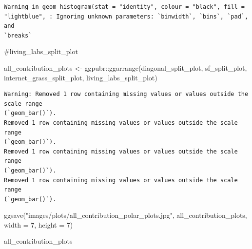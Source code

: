 \documentclass[
  letterpaper,
  DIV=11,
  numbers=noendperiod]{scrreprt}
\newenvironment{Shaded}{\begin{snugshade}}{\end{snugshade}}
\newcommand{\AttributeTok}[1]{\textcolor[rgb]{0.40,0.45,0.13}{#1}}
\newcommand{\CommentTok}[1]{\textcolor[rgb]{0.37,0.37,0.37}{#1}}
\newcommand{\DecValTok}[1]{\textcolor[rgb]{0.68,0.00,0.00}{#1}}
\newcommand{\FunctionTok}[1]{\textcolor[rgb]{0.28,0.35,0.67}{#1}}
\newcommand{\NormalTok}[1]{\textcolor[rgb]{0.00,0.23,0.31}{#1}}
\newcommand{\OtherTok}[1]{\textcolor[rgb]{0.00,0.23,0.31}{#1}}
\newcommand{\SpecialCharTok}[1]{\textcolor[rgb]{0.37,0.37,0.37}{#1}}
\newcommand{\StringTok}[1]{\textcolor[rgb]{0.13,0.47,0.30}{#1}}
\begin{document}
\begin{verbatim}
Warning in geom_histogram(stat = "identity", colour = "black", fill =
"lightblue", : Ignoring unknown parameters: `binwidth`, `bins`, `pad`, and
`breaks`
\end{verbatim}

\begin{Shaded}
\begin{Highlighting}[]
\CommentTok{\#living\_labs\_split\_plot}
\end{Highlighting}
\end{Shaded}

\begin{Shaded}
\begin{Highlighting}[]
\NormalTok{all\_contribution\_plots }\OtherTok{\textless{}{-}}\NormalTok{ ggpubr}\SpecialCharTok{::}\FunctionTok{ggarrange}\NormalTok{(diagonal\_split\_plot, }
\NormalTok{                                            sf\_split\_plot, }
\NormalTok{                                            internet\_grass\_split\_plot, }
\NormalTok{                                            living\_labs\_split\_plot)}
\end{Highlighting}
\end{Shaded}

\begin{verbatim}
Warning: Removed 1 row containing missing values or values outside the scale range
(`geom_bar()`).
Removed 1 row containing missing values or values outside the scale range
(`geom_bar()`).
Removed 1 row containing missing values or values outside the scale range
(`geom_bar()`).
Removed 1 row containing missing values or values outside the scale range
(`geom_bar()`).
\end{verbatim}

\begin{Shaded}
\begin{Highlighting}[]
\FunctionTok{ggsave}\NormalTok{(}\StringTok{"images/plots/all\_contribution\_polar\_plots.jpg"}\NormalTok{, }
\NormalTok{       all\_contribution\_plots, }\AttributeTok{width =} \DecValTok{7}\NormalTok{, }
       \AttributeTok{height =} \DecValTok{7}\NormalTok{)}

\NormalTok{all\_contribution\_plots}
\end{Highlighting}
\end{Shaded}
\end{document}
